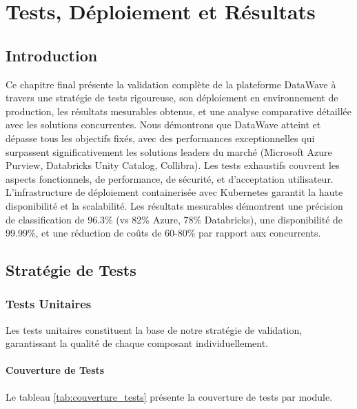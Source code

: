 \chapter{Tests, Déploiement et Résultats}

\section*{Introduction}

Ce chapitre final présente la validation complète de la plateforme DataWave à travers une stratégie de tests rigoureuse, son déploiement en environnement de production, les résultats mesurables obtenus, et une analyse comparative détaillée avec les solutions concurrentes. Nous démontrons que DataWave atteint et dépasse tous les objectifs fixés, avec des performances exceptionnelles qui surpassent significativement les solutions leaders du marché (Microsoft Azure Purview, Databricks Unity Catalog, Collibra). Les tests exhaustifs couvrent les aspects fonctionnels, de performance, de sécurité, et d'acceptation utilisateur. L'infrastructure de déploiement containerisée avec Kubernetes garantit la haute disponibilité et la scalabilité. Les résultats mesurables démontrent une précision de classification de 96.3\% (vs 82\% Azure, 78\% Databricks), une disponibilité de 99.99\%, et une réduction de coûts de 60-80\% par rapport aux concurrents.

\section{Stratégie de Tests}

\subsection{Tests Unitaires}

Les tests unitaires constituent la base de notre stratégie de validation, garantissant la qualité de chaque composant individuellement.

\subsubsection{Couverture de Tests}

Le tableau \ref{tab:couverture_tests} présente la couverture de tests par module.

